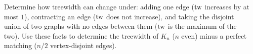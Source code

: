 \begin{exercise}
Determine how treewidth can change under: adding one edge ($\operatorname{tw}$ increases by at
most $1$), contracting an edge ($\operatorname{tw}$ does not increase), and taking the disjoint
union of two graphs with no edges between them ($\operatorname{tw}$ is the maximum of the two).
Use these facts to determine the treewidth of $K_n$ ($n$ even) minus a perfect
matching ($n/2$ vertex-disjoint edges).
\end{exercise}
